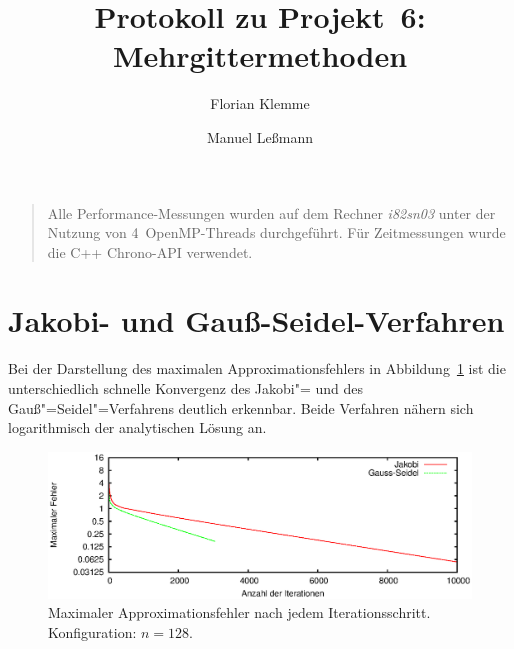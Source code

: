 \documentclass[paper = a4]{scrartcl}
\begin{document}
\subject{Praktikum Multicore"=Programmierung}
\title{Protokoll zu Projekt~6: Mehrgittermethoden}
\author{Florian Klemme \and Manuel Leßmann}
\maketitle

\begin{quote}
Alle Performance-Messungen wurden auf dem Rechner \emph{i82sn03} unter der Nutzung von 4~OpenMP-Threads durchgeführt. Für Zeitmessungen wurde die C++ Chrono-API verwendet.
\end{quote}

\section{Jakobi- und Gauß-Seidel-Verfahren}

Bei der Darstellung des maximalen Approximationsfehlers in Abbildung~\ref{fig:fehler} ist die unterschiedlich schnelle Konvergenz des Jakobi"= und des Gauß"=Seidel"=Verfahrens deutlich erkennbar. Beide Verfahren nähern sich logarithmisch der analytischen Lösung an.

\begin{figure}
    \centering
    \includegraphics[width=\textwidth]{fehler}
    \caption{Maximaler Approximationsfehler nach jedem Iterationsschritt. Konfiguration: \(n = 128\).}
    \label{fig:fehler}
\end{figure}
\end{document}
